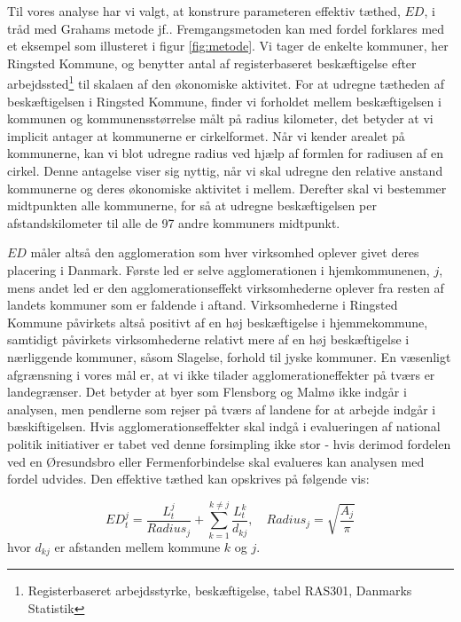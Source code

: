 \documentclass[a4paper, 12pt, titlepage]{article}
\begin{document}
Til vores analyse har vi valgt, at konstrure parameteren effektiv tæthed, $ED$, i tråd med Grahams metode jf.\cite{graham2007agglomeration}. Fremgangsmetoden kan med fordel forklares med et eksempel som illusteret i figur \ref{fig:metode}. Vi tager de enkelte kommuner, her Ringsted Kommune, og benytter antal af registerbaseret beskæftigelse efter arbejdssted\footnote{Registerbaseret arbejdsstyrke, beskæftigelse, tabel RAS301, Danmarks Statistik} til skalaen af den økonomiske aktivitet. For at udregne tætheden af beskæftigelsen i Ringsted Kommune, finder vi forholdet mellem beskæftigelsen i kommunen og kommunensstørrelse målt på radius kilometer, det betyder at vi implicit antager at kommunerne er cirkelformet. Når vi kender arealet på kommunerne, kan vi blot udregne radius ved hjælp af formlen for radiusen af en cirkel. Denne antagelse viser sig nyttig, når vi skal udregne den relative anstand kommunerne og deres økonomiske aktivitet i mellem. Derefter skal vi bestemmer midtpunkten alle kommunerne, for så at udregne beskæftigelsen per afstandskilometer til alle de 97 andre kommuners midtpunkt. 

$ED$ måler altså den agglomeration som hver virksomhed oplever givet deres placering i Danmark. Første led er selve agglomerationen i hjemkommunenen, $j$, mens andet led er den agglomerationseffekt virksomhederne oplever fra resten af landets kommuner som er faldende i aftand. Virksomhederne i Ringsted Kommune påvirkets altså positivt af en høj beskæftigelse i hjemmekommune, samtidigt påvirkets virksomhederne relativt mere af en høj beskæftigelse i nærliggende kommuner, såsom Slagelse, forhold til jyske kommuner. En væsenligt afgrænsning i vores mål er, at vi ikke tilader agglomerationeffekter på tværs er landegrænser. Det betyder at byer som Flensborg og Malmø ikke indgår i analysen, men pendlerne som rejser på tværs af landene for at arbejde indgår i bæskiftigelsen. Hvis agglomerationseffekter skal indgå i evalueringen af national politik initiativer er tabet ved denne forsimpling ikke stor - hvis derimod fordelen ved en Øresundsbro eller Fermenforbindelse skal evalueres kan analysen med fordel udvides. Den effektive tæthed kan opskrives på følgende vis: 

\begin{equation}
   ED^j_t = \frac{L^j_t}{Radius_j} + \sum_{k=1}^{k \neq j} \frac{L^k_t}{d_{kj}}, \quad Radius_j = \sqrt{\frac{A_j}{\pi}}
 \end{equation} 
 hvor $d_{kj}$ er afstanden mellem kommune $k$ og $j$. 
 
\end{document}

